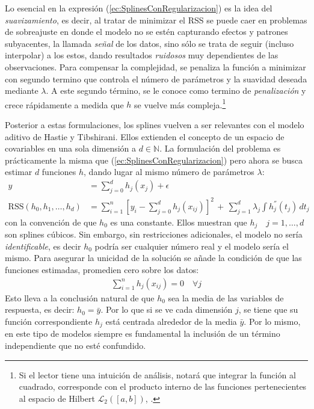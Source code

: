\documentclass[../../Main/Main.tex]{subfiles}
\begin{document}
Lo esencial en la expresión (\ref{ec:SplinesConRegularizacion}) es la idea del \emph{suavizamiento}, es decir, al tratar de minimizar el RSS se puede caer en problemas de sobreajuste en donde el modelo no se estén capturando efectos y patrones subyacentes, la llamada \emph{señal} de los datos, sino sólo se trata de seguir (incluso interpolar) a los estos, dando resultados \textit{ruidosos} muy dependientes de las observaciones. Para compensar la complejidad, se penaliza la función a minimizar con segundo termino que controla el número de parámetros y la suavidad deseada mediante $\lambda$. A este segundo término, se le conoce como termino de \emph{penalización} y crece rápidamente a medida que $h$ se vuelve más compleja.\footnote{Si el lector tiene una intuición de análisis, notará que integrar la función al cuadrado, corresponde con el producto interno de las funciones pertenecientes al espacio de Hilbert $\mathcal{L}_2([a,b])$, \citet{bergstrom1985estimation}.}

Posterior a estas formulaciones, los splines vuelven a ser relevantes con el modelo aditivo de Hastie y Tibshirani. Ellos extienden el concepto de un espacio de covariables en una sola dimensión a $d\in\mathbb{N}$. La formulación del problema es prácticamente la misma que  (\ref{ec:SplinesConRegularizacion}) pero ahora se busca estimar $d$ funciones $h$, dando lugar al mismo número de parámetros $\lambda$:
\begin{align*}
	y &= \sum_{j = 0}^d h_j(x_j) + \epsilon \\	
	\text{RSS}(h_0, h_1, \ldots, h_d) &= \sum_{i = 1}^n[y_i - \sum_{j = 0}^d h_j(x_{ij})]^2 \, + \, \sum_{j = 1}^d\lambda_j 			\int h_j^{''}(t_j) \, dt_j
\end{align*}
con la convención de que $h_0$ es una constante. Ellos muestran que $h_j \quad j = 1,\ldots,d$ son splines cúbicos. Sin embargo, sin restricciones adicionales, el modelo no sería \textit{identificable}, es decir $h_0$ podría ser cualquier número real y el modelo sería el mismo. Para asegurar la unicidad de la solución se añade la condición de que las funciones estimadas, promedien cero sobre los datos:
\begin{align}
	\sum_{i = 1}^n h_j(x_{ij}) = 0 \quad \forall j \label{ec:RestriccionGAM}
\end{align}
Esto lleva a la conclusión natural de que $h_0$ sea la media de las variables de respuesta, es decir: $h_0 = \bar{y}$. Por lo que si se ve cada dimensión $j$, se tiene que su función correspondiente $h_j$ está centrada alrededor de la media $\bar{y}$. Por lo mismo, en este tipo de modelos siempre es fundamental la inclusión de un término independiente que no esté confundido.
\end{document}
